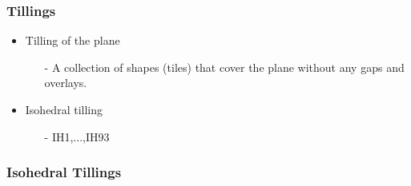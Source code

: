 \documentclass[serif,mathserif, 12pt]{beamer}
\begin{document}
\begin{frame}
  \frametitle{Tillings}
  \begin{itemize}
  \item Tilling of the plane
    \begin{itemize}
    \item[-] A collection of shapes (tiles) that cover the plane without any gaps and overlays.
    \end{itemize}
  \item Isohedral tilling
    \begin{itemize}
    \item[-] IH1,...,IH93
    \end{itemize}
  \end{itemize}
\end{frame}

\begin{frame}
  \frametitle{Isohedral Tillings}
\end{frame}
\end{document}
